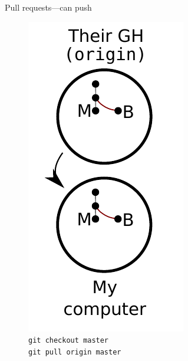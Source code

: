 \begin{frame}{Pull requests---can push}
  \begin{figure}
    \includegraphics{push_006.pdf}
    \\ \texttt{git checkout master}
    \\ \texttt{git pull origin master}
  \end{figure}
\end{frame}

